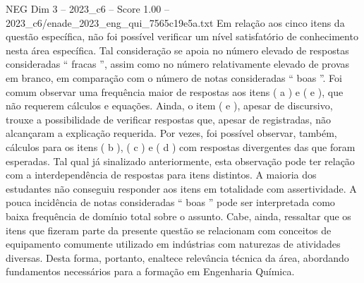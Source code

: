 \begin{textsample}{NEG Dim 3 – 2023\_c6 – Score 1.00 – 2023\_c6/enade\_2023\_eng\_qui\_7565c19e5a.txt}
Em relação aos cinco itens da questão específica, não foi possível verificar um nível satisfatório de conhecimento nesta área específica.
Tal consideração se apoia no número elevado de respostas consideradas “ fracas ”, assim como no número relativamente elevado de provas em branco, em comparação com o número de notas consideradas “ boas ”.
Foi comum observar uma frequência maior de respostas aos itens ( a ) e ( e ), que não requerem cálculos e equações.
Ainda, o item ( e ), apesar de discursivo, trouxe a possibilidade de verificar respostas que, apesar de registradas, não alcançaram a explicação requerida.
Por vezes, foi possível observar, também, cálculos para os itens ( b ), ( c ) e ( d ) com respostas divergentes das que foram esperadas.
Tal qual já sinalizado anteriormente, esta observação pode ter relação com a interdependência de respostas para itens distintos.
A maioria dos estudantes não conseguiu responder aos itens em totalidade com assertividade.
A pouca incidência de notas consideradas “ boas ” pode ser interpretada como baixa frequência de domínio total sobre o assunto.
Cabe, ainda, ressaltar que os itens que fizeram parte da presente questão se relacionam com conceitos de equipamento comumente utilizado em indústrias com naturezas de atividades diversas.
Desta forma, portanto, enaltece relevância técnica da área, abordando fundamentos necessários para a formação em Engenharia Química.

\end{textsample}
